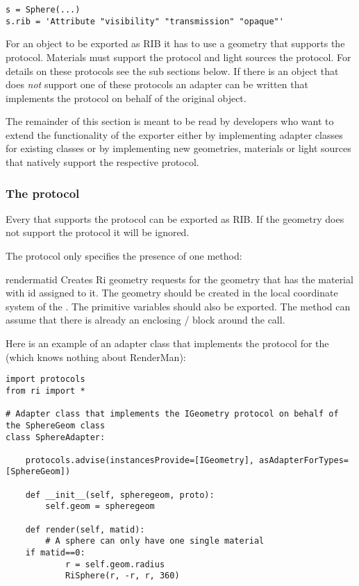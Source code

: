 \begin{verbatim}
s = Sphere(...)
s.rib = 'Attribute "visibility" "transmission" "opaque"'
\end{verbatim}

For an object to be exported as RIB it has to use a geometry that supports
the  protocol. Materials must support the 
protocol and light sources the  protocol. For details
on these protocols see the sub sections below. If there is an object that
does {\em not} support one of these protocols an adapter can be written
that implements the protocol on behalf of the original object.

The remainder of this section is meant to be read by developers who
want to extend the functionality of the exporter either by implementing 
adapter classes for existing classes or by implementing new geometries,
materials or light sources that natively support the respective protocol.

\subsubsection{The  protocol}

Every  that supports the  protocol
can be exported as RIB. If the geometry does not support the protocol
it will be ignored.

The  protocol only specifies the presence of one method:

\begin{methoddesc}[IGeometry]{render}{matid}
Creates Ri geometry requests for the geometry that has the material with 
id  assigned to it. 
The geometry should be created in the local coordinate system
of the . The primitive variables should also be exported.
The method can assume that there is already an enclosing 
/ block around the 
call.
\end{methoddesc}

Here is an example of an adapter class that implements the 
protocol for the  (which knows nothing about RenderMan):

\begin{verbatim}
import protocols
from ri import *

# Adapter class that implements the IGeometry protocol on behalf of the SphereGeom class
class SphereAdapter:

    protocols.advise(instancesProvide=[IGeometry], asAdapterForTypes=[SphereGeom])
    
    def __init__(self, spheregeom, proto):
        self.geom = spheregeom

    def render(self, matid):
        # A sphere can only have one single material
	if matid==0:
            r = self.geom.radius
            RiSphere(r, -r, r, 360)
\end{verbatim}


